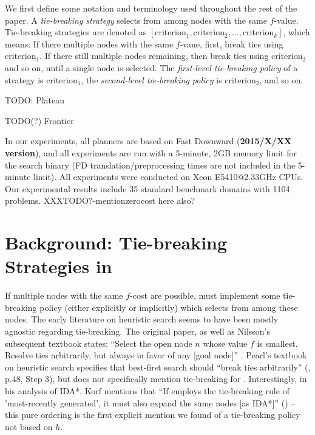 We first define some notation and terminology used throughout the rest of the paper.
A \emph{tie-breaking strategy} selects from among nodes with the same $f$-value.
Tie-breaking strategies are denoted as $[\text{criterion}_1, \text{criterion}_2, ..., \text{criterion}_k]$,
which means: If there multiple nodes with the same $f$-vaue, first, break ties using $\text{criterion}_1$. 
If there still multiple nodes remaining, then break ties using $\text{criterion}_2$ and so on, until a single node is selected.
The \emph{first-level tie-breaking policy} of a strategy is $\text{criterion}_1$, the \emph{second-level tie-breaking policy} is $\text{criterion}_2$, and so on.

TODO: Plateau

TODO(?) Frontier

In our experiments, all planners are based on Fast Downward ({\bf 2015/X/XX version}), and all
experiments are run with a 5-minute, 2GB memory limit for the search binary (FD translation/preprocessing times are not included in the 5-minute limit).
All experiments were conducted on Xeon E5410@2.33GHz CPUs.
Our experimental results include 35 standard benchmark domains with 1104
problems.
XXXTODO?-mentionzerocost here also? %

\section{Background: Tie-breaking Strategies in \astar}


If multiple nodes with the same $f$-cost are possible, \astar
must implement some tie-breaking policy (either
explicitly or implicitly) which selects from among these nodes.
The early literature on heuristic search seems to have been mostly agnostic regarding tie-breaking.
The original \astar paper, as well as Nilsson's
subsequent textbook states: ``Select the open node $n$ whose value $f$
is smallest. Resolve ties arbitrarily, but always in favor of any [goal
node]'' \cite[p.102 Step 2]{hart1968formal} \cite[p.69]{Nilsson71}.
Pearl's textbook on heuristic search specifies that best-first search should ``break ties arbitrarily'' (\citeyear{pearl1984heuristics}, p.48, Step 3), but does not specifically mention tie-breaking for \astar.
Interestingly, in his analysis of IDA*, Korf mentions that ``If \astar employs the tie-breaking rule of 'most-recently generated', it must also expand the same nodes [as IDA*]'' (\citeyear{korf1985depth}) -- this pure \lifo ordering is the first explicit mention we found of a tie-breaking policy not based on $h$.

